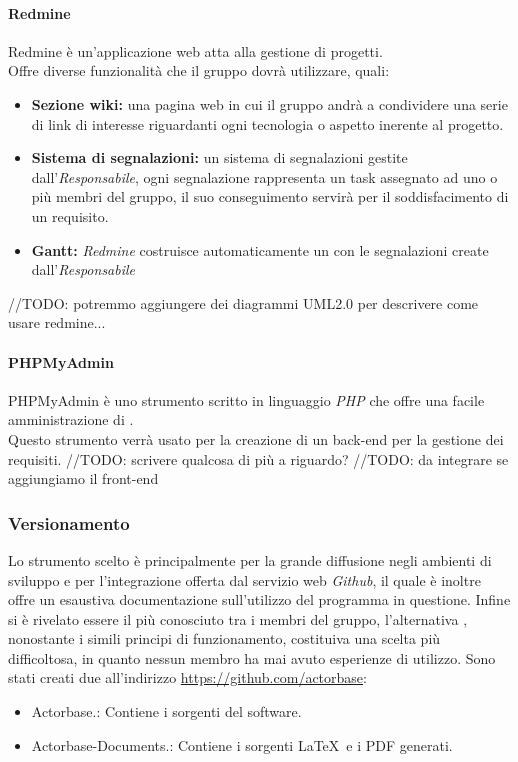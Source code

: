 \documentclass{scalatekids-article}
\begin{document}
\paragraph{Redmine}
Redmine è un'applicazione web atta alla gestione di progetti.\\
Offre diverse funzionalità che il gruppo dovrà utilizzare, quali:
\begin{itemize}
\item\textbf{Sezione wiki:} una pagina web in cui il gruppo andrà a condividere una serie di link di interesse riguardanti ogni tecnologia o aspetto inerente al progetto.
\item\textbf{Sistema di segnalazioni:} un sistema di segnalazioni gestite dall'\textit{Responsabile}, ogni segnalazione rappresenta un task assegnato ad uno o più membri del gruppo, il suo conseguimento servirà per il soddisfacimento di un requisito.
\item\textbf{Gantt:} \textit{Redmine} costruisce automaticamente un  con le segnalazioni create dall'\textit{Responsabile}
\end{itemize}
//TODO: potremmo aggiungere dei diagrammi UML2.0 per descrivere come usare redmine...

\paragraph{PHPMyAdmin}
PHPMyAdmin è uno strumento scritto in linguaggio \textit{PHP} che offre una facile amministrazione di .\\
Questo strumento verrà usato per la creazione di un back-end per la gestione dei requisiti.	//TODO: scrivere qualcosa di più a riguardo?
//TODO: da integrare se aggiungiamo il front-end

\subsubsection{Versionamento}
Lo strumento scelto è  principalmente per la grande diffusione negli
ambienti di sviluppo e per l'integrazione offerta dal servizio web
\textit{Github}, il quale è inoltre offre un esaustiva documentazione
sull'utilizzo del programma in questione. Infine  si è rivelato essere
il più conosciuto tra i membri del gruppo, l'alternativa , nonostante
i simili principi di funzionamento, costituiva una scelta più difficoltosa, in
quanto nessun membro ha mai avuto esperienze di utilizzo.
Sono stati creati due  all'indirizzo \url{https://github.com/actorbase}:
\begin{itemize}
\item Actorbase.: Contiene i sorgenti del software.
\item Actorbase-Documents.: Contiene i sorgenti \LaTeX\ e i PDF generati.
\end{itemize}
\end{document}

